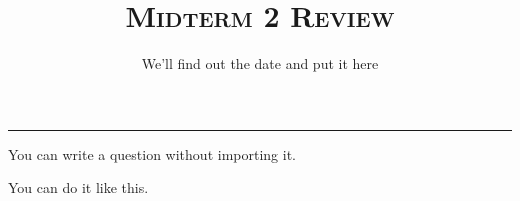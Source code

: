\documentclass{exam}
\title{\textsc{Midterm 2 Review}}
\date{We'll find out the date and put it here }
\begin{document}
	\maketitle
	\rule{\textwidth}{0.15em}
	\fontsize{12}{15}\selectfont

\begin{questions}
\question
You can write a question without importing it.

\question You can do it like this. 

\end{questions}
\end{document}
